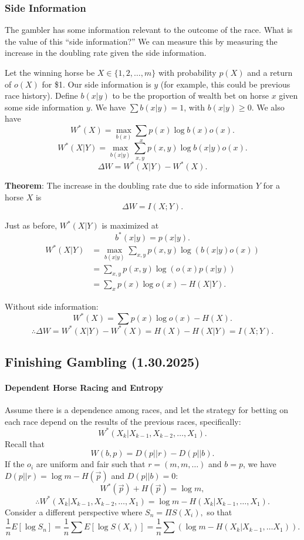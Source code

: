 \documentclass[12pt]{article}
\theoremstyle{remark}
\begin{document}
\subsubsection{Side Information}
The gambler has some information relevant to the outcome of the race. What is the value of this ``side information?'' We can measure this by measuring the increase in the doubling rate given the side information.

Let the winning horse be
$X\in\{1,2,\dots,m\}$ with probability $p(X)$ and a return of $o(X)$ for \$1. Our side information is $y$ (for example, this could be previous race history). Define $b(x|y)$ to be the proportion of wealth bet on horse $x$ given some side information $y.$ 
We have $\sum b(x|y)=1$, with $b(x|y)\ge 0.$
We also have
\[W^\ast(X) = \max_{b(x)}\sum_x p(x)\log b(x) o(x).\]
\[W^\ast(X|Y) = \max_{b(x|y)}\sum_{x,y}p(x,y)\log b(x|y)o(x).\]
\[\Delta W = W^\ast(X|Y)-W^\ast(X).\]

\textbf{Theorem}: The increase in the doubling rate due to side information $Y$ for a horse $X$ is
\[\Delta W=I(X;Y).\]

Just as before, $W^\ast(X|Y)$ is maximized at
\[b^\ast(x|y)=p(x|y).\]
\begin{align*}W^\ast(X|Y)&=\max_{b(x|y)}\sum_{x,y} p(x,y)\log \left(b(x|y) o(x)\right)\\&=\sum_{x,y} p(x,y)\log\left(o(x)p(x|y)\right)\\&=\sum_xp(x)\log o(x)-H(X|Y).\end{align*}

Without side information:
\[W^\ast(X)=\sum p(x)\log o(x)-H(X).\] 
\[\therefore \Delta W= W^\ast(X|Y)-W^\ast(X)=H(X)-H(X|Y)=\boxed{I(X;Y)}.\]

\subsection{Finishing Gambling (1.30.2025)}

\paragraph{Dependent Horse Racing and Entropy}
Assume there is a dependence among races, and let the strategy for betting on each race depend on the results of the previous races, specifically:
\[W^\ast(X_k|X_{k-1},X_{k-2},\dots,X_1).\]
Recall that 
\[W(b,p) = D(p||r) - D(p||b).\] If the $o_i$ are uniform and fair such that $r=(m,m,\dots)$ and $b=p$, we have $D(p||r) = \log m - H(\vec{p})$ and $D(p||b) = 0$:
\[W^\ast(\vec p) + H(\vec p) = \log m,\]
\[\therefore W^\ast(X_k|X_{k-1},X_{k-2},\dots,X_1)=\log m - H(X_k|X_{k-1},\dots,X_1).\]
Consider a different perspective where $S_n = \Pi S(X_i),$ so that
\[\frac{1}{n}E[\log S_n] = \frac{1}{n}\sum E[\log S(X_i)]=\frac{1}{n}\sum(\log m - H(X_k|X_{k-1},\dots X_1)).\]
\end{document}
